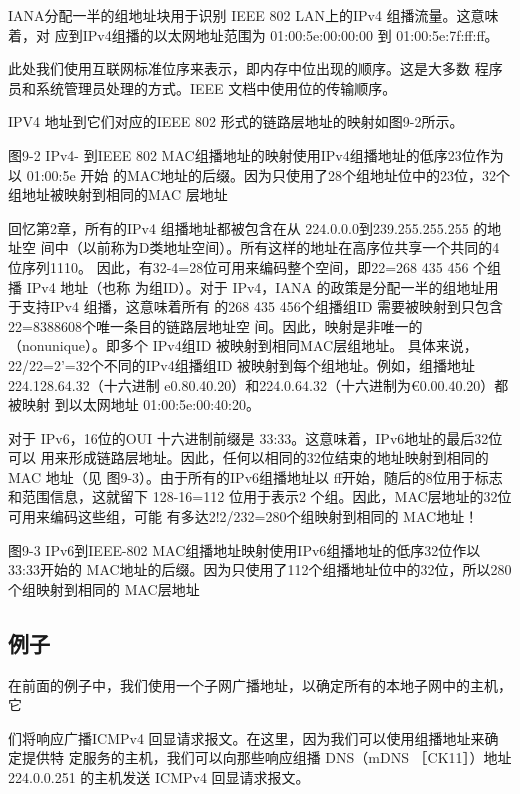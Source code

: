 IANA分配一半的组地址块用于识别 IEEE 802 LAN上的IPv4 组播流量。这意味着，对
应到IPv4组播的以太网地址范围为 01:00:5e:00:00:00 到 01:00:5e:7f:ff:ff。

\begin{tcolorbox}
    此处我们使用互联网标准位序来表示，即内存中位出现的顺序。这是大多数
    程序员和系统管理员处理的方式。IEEE 文档中使用位的传输顺序。
\end{tcolorbox}

IPV4 地址到它们对应的IEEE 802 形式的链路层地址的映射如图9-2所示。

图9-2 IPv4- 到IEEE 802 MAC组播地址的映射使用IPv4组播地址的低序23位作为以 01:00:5e 开始
的MAC地址的后缀。因为只使用了28个组地址位中的23位，32个组地址被映射到相同的MAC 层地址

回忆第2章，所有的IPv4 组播地址都被包含在从 224.0.0.0到239.255.255.255 的地址空
间中（以前称为D类地址空间）。所有这样的地址在高序位共享一个共同的4位序列1110。
因此，有32-4=28位可用来编码整个空间，即22=268 435 456 个组播 IPv4 地址（也称
为组ID）。对于 IPv4，IANA 的政策是分配一半的组地址用于支持IPv4 组播，这意味着所有
的268 435 456个组播组ID 需要被映射到只包含22=8388608个唯一条目的链路层地址空
间。因此，映射是非唯一的（nonunique）。即多个 IPv4组ID 被映射到相同MAC层组地址。
具体来说，22/22=2’=32个不同的IPv4组播组ID 被映射到每个组地址。例如，组播地址
224.128.64.32（十六进制 e0.80.40.20）和224.0.64.32（十六进制为€0.00.40.20）都被映射
到以太网地址 01:00:5e:00:40:20。

对于 IPv6，16位的OUI 十六进制前缀是 33:33。这意味着，IPv6地址的最后32位可以
用来形成链路层地址。因此，任何以相同的32位结束的地址映射到相同的MAC 地址（见
图9-3）。由于所有的IPv6组播地址以 ff开始，随后的8位用于标志和范围信息，这就留下
128-16=112 位用于表示2 个组。因此，MAC层地址的32位可用来编码这些组，可能
有多达2!2/232=280个组映射到相同的 MAC地址！

图9-3 IPv6到IEEE-802 MAC组播地址映射使用IPv6组播地址的低序32位作以33:33开始的
MAC地址的后缀。因为只使用了112个组播地址位中的32位，所以280个组映射到相同的
MAC层地址

\subsection{例子}
在前面的例子中，我们使用一个子网广播地址，以确定所有的本地子网中的主机，它

们将响应广播ICMPv4 回显请求报文。在这里，因为我们可以使用组播地址来确定提供特
定服务的主机，我们可以向那些响应组播 DNS（mDNS ［CK11］）地址224.0.0.251 的主机发送
ICMPv4 回显请求报文。

